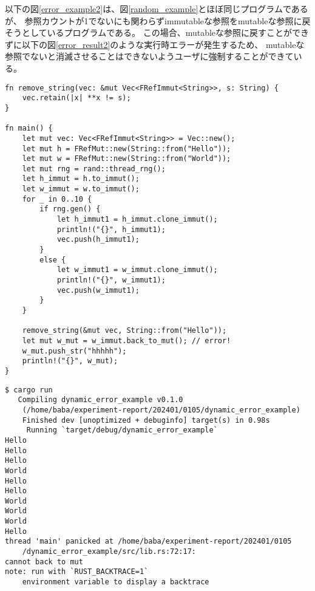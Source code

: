 \documentclass{sumiilab-paper}
\theoremstyle{mystyle}
\numberwithin{definition}{chapter} %
\begin{document}
以下の図\ref{error_example2}は、図\ref{random_example}とほぼ同じプログラムであるが、
参照カウントが1でないにも関わらずimmutableな参照をmutableな参照に戻そうとしているプログラムである。
この場合、mutableな参照に戻すことができずに以下の図\ref{error_result2}のような実行時エラーが発生するため、
mutableな参照でないと消滅させることはできないようユーザに強制することができている。
\begin{lstlisting}[caption=Mutableな参照へ戻せないことを検出する例, 
  label=error_example2, captionpos=b]
fn remove_string(vec: &mut Vec<FRefImmut<String>>, s: String) {
    vec.retain(|x| **x != s);
}

fn main() {
    let mut vec: Vec<FRefImmut<String>> = Vec::new();
    let mut h = FRefMut::new(String::from("Hello"));
    let mut w = FRefMut::new(String::from("World"));
    let mut rng = rand::thread_rng();
    let h_immut = h.to_immut();
    let w_immut = w.to_immut();
    for _ in 0..10 {
        if rng.gen() {
            let h_immut1 = h_immut.clone_immut();
            println!("{}", h_immut1);
            vec.push(h_immut1);
        }
        else {
            let w_immut1 = w_immut.clone_immut();
            println!("{}", w_immut1);
            vec.push(w_immut1);
        }
    }

    remove_string(&mut vec, String::from("Hello"));
    let mut w_mut = w_immut.back_to_mut(); // error!
    w_mut.push_str("hhhhh");
    println!("{}", w_mut);
}
\end{lstlisting}
\begin{lstlisting}[caption=Mutableな参照に戻し忘れた際のエラー, 
  label=error_result2, captionpos=b]
$ cargo run
   Compiling dynamic_error_example v0.1.0
    (/home/baba/experiment-report/202401/0105/dynamic_error_example)
    Finished dev [unoptimized + debuginfo] target(s) in 0.98s
     Running `target/debug/dynamic_error_example`
Hello
Hello
Hello
World
Hello
Hello
World
World
World
Hello
thread 'main' panicked at /home/baba/experiment-report/202401/0105
    /dynamic_error_example/src/lib.rs:72:17:
cannot back to mut
note: run with `RUST_BACKTRACE=1` 
    environment variable to display a backtrace
\end{lstlisting}
\end{document}
